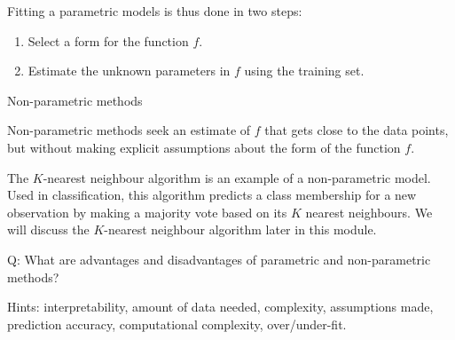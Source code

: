 \documentclass[ignorenonframetext,]{beamer}
\providecommand{\tightlist}{%
  \setlength{\itemsep}{0pt}\setlength{\parskip}{0pt}}
\begin{document}
\begin{frame}

Fitting a parametric models is thus done in two steps:

\begin{enumerate}
\def\labelenumi{\arabic{enumi}.}
\tightlist
\item
  Select a form for the function \(f\).\\
\item
  Estimate the unknown parameters in \(f\) using the training set.
\end{enumerate}

\end{frame}

\begin{frame}

\begin{block}{Non-parametric methods}

Non-parametric methods seek an estimate of \(f\) that gets close to the
data points, but without making explicit assumptions about the form of
the function \(f\).

The \(K\)-nearest neighbour algorithm is an example of a non-parametric
model. Used in classification, this algorithm predicts a class
membership for a new observation by making a majority vote based on its
\(K\) nearest neighbours. We will discuss the \(K\)-nearest neighbour
algorithm later in this module.

\end{block}

\end{frame}

\begin{frame}

\begin{block}{Q: What are advantages and disadvantages of parametric and
non-parametric methods?}

Hints: interpretability, amount of data needed, complexity, assumptions
made, prediction accuracy, computational complexity, over/under-fit.

\end{block}

\end{frame}
\end{document}

